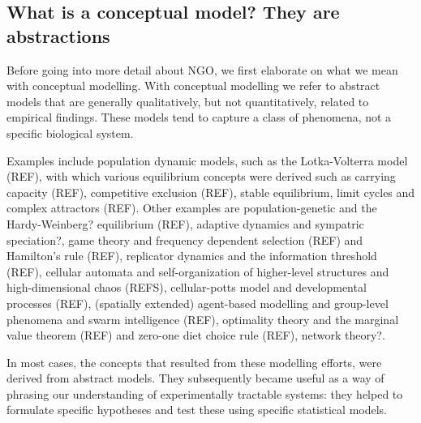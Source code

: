 \subsection{What is a conceptual model? They are abstractions}

Before going into more detail about NGO, we first elaborate on what we mean with conceptual modelling. With conceptual modelling we refer to abstract models that are generally qualitatively, but not quantitatively, related to empirical findings. These models tend to capture a class of phenomena, not a specific biological system.

Examples include population dynamic models, such as the Lotka-Volterra model (REF), with which various equilibrium concepts were derived such as carrying capacity (REF), competitive exclusion (REF), stable equilibrium, limit cycles and complex attractors (REF). Other examples are population-genetic and the Hardy-Weinberg? equilibrium (REF), adaptive dynamics and sympatric speciation?, game theory and frequency dependent selection (REF) and Hamilton’s rule (REF), replicator dynamics and the information threshold (REF), cellular automata and self-organization of higher-level structures and high-dimensional chaos (REFS), cellular-potts model and developmental processes (REF), (spatially extended) agent-based modelling and group-level phenomena and swarm intelligence (REF), optimality theory and the marginal value theorem (REF) and zero-one diet choice rule (REF), network theory?.

In most cases, the concepts that resulted from these modelling efforts, were derived from abstract models. They subsequently became useful as a way of phrasing our understanding of experimentally tractable systems: they helped to formulate specific hypotheses and test these using specific statistical models.
  